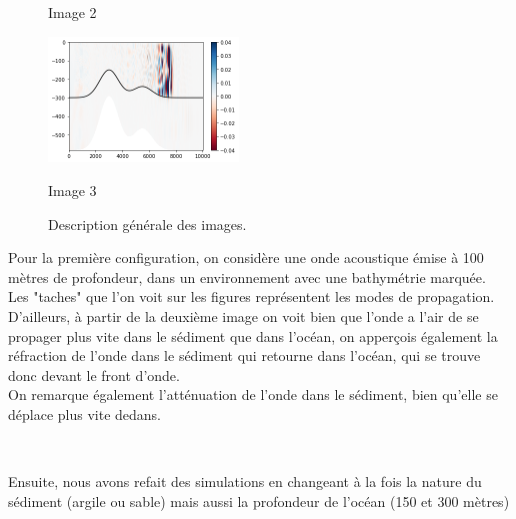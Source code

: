 \documentclass{rapportECC}
\begin{document}
\begin{figure}[H]
\begin{minipage}{0.45\textwidth}
        \caption{Image 2}
        \label{fig:image2}
    \end{minipage}
    \vspace{1cm} %
    \begin{minipage}{0.9\textwidth}
        \centering
        \includegraphics[width=0.45\textwidth]{images/im6.png}
        \caption{Image 3}
        \label{fig:image3}
    \end{minipage}
    \caption{Description générale des images.}
    \label{fig:three_images}
\end{figure}
Pour la première configuration, on considère une onde acoustique émise à 100 mètres de profondeur, dans un environnement avec une bathymétrie marquée. \\
Les "taches" que l'on voit sur les figures représentent les modes de propagation. \\
D'ailleurs, à  partir de la deuxième image on voit bien que l'onde a l'air de se propager plus vite dans le sédiment que dans l'océan, on apperçois également la réfraction de l'onde dans le sédiment qui retourne dans l'océan, qui se trouve donc devant le front d'onde.\\
On remarque également l'atténuation de l'onde dans le sédiment, bien qu'elle se déplace plus vite dedans.

\\
\vspace{1 cm}

Ensuite, nous avons refait des simulations en changeant à la fois la nature du sédiment (argile ou sable) mais aussi la profondeur de l'océan (150 et 300 mètres)
\end{document}
